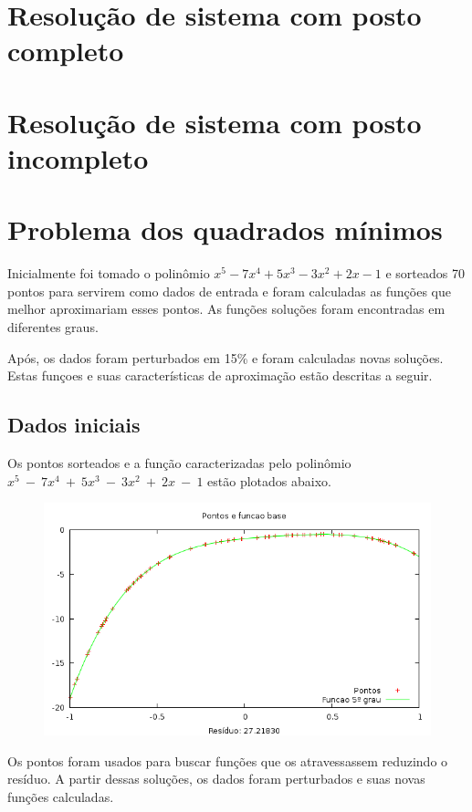 \chapter{Resolução de sistema com posto completo}


\chapter{Resolução de sistema com posto incompleto}


\chapter{Problema dos quadrados mínimos}
Inicialmente foi tomado o polinômio $x^5-7x^4+5x^3-3x^2+2x-1$ e sorteados
70 pontos para servirem como  dados de entrada e foram calculadas as funções que
melhor aproximariam esses pontos.
As funções soluções foram encontradas em diferentes graus. 

Após, os dados foram perturbados em 15\% e foram calculadas novas
soluções. Estas funçoes e suas características de aproximação estão descritas 
a seguir.

\section{Dados iniciais}
Os pontos sorteados e a função caracterizadas pelo polinômio $x^5~-~7x^4~+~5x^3~-~3x^2~+~2x~-~1$
estão plotados abaixo.

\begin{figure}[h]
\centering
\includegraphics[scale=0.7]{funcbase}
\end{figure}

Os pontos foram usados para buscar funções que os atravessassem reduzindo o resíduo.
A partir dessas soluções, os dados foram perturbados e suas novas funções calculadas.



